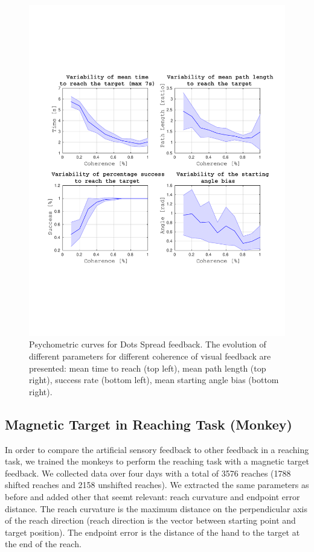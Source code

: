 \documentclass[preprint,12pt]{elsarticle}
\begin{document}
\begin{figure}[htbp]
\includegraphics[width=1\textwidth,trim={1.5cm 5cm 1.2cm 5cm},clip]{figures/SD_mean_human.pdf}
\caption{Psychometric curves for Dots Spread feedback. The evolution of different parameters for different coherence of visual feedback are presented: mean time to reach (top left), mean path length (top right), success rate (bottom left), mean starting angle bias (bottom right).}
\label{fig:SD}
\end{figure}

\subsection{Magnetic Target in Reaching Task (Monkey)}
In order to compare the artificial sensory feedback to other feedback in a reaching task, we trained the monkeys to perform the reaching task with a magnetic target feedback. We collected data over four days with a total of 3576 reaches (1788 shifted reaches and 2158 unshifted reaches). We extracted the same parameters as before and added other that seemt relevant: reach curvature and endpoint error distance. The reach curvature is the maximum distance on the perpendicular axis of the reach direction (reach direction is the vector between starting point and target position). The endpoint error is the distance of the hand to the target at the end of the reach. 
\end{document}
